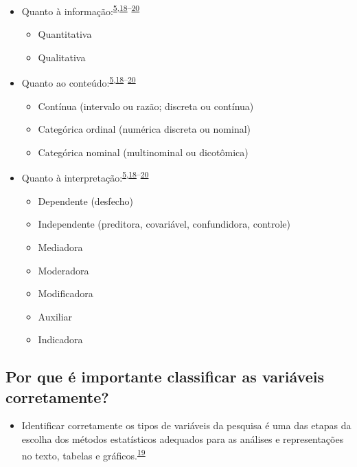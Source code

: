 \documentclass[
]{book}
\providecommand{\tightlist}{%
  \setlength{\itemsep}{0pt}\setlength{\parskip}{0pt}}
\begin{document}
\begin{itemize}
\item
  Quanto à informação:\textsuperscript{\protect\hyperlink{ref-vetter2017}{5},\protect\hyperlink{ref-Ali2016}{18}--\protect\hyperlink{ref-kaliyadan2019}{20}}

  \begin{itemize}
  \item
    Quantitativa
  \item
    Qualitativa
  \end{itemize}
\item
  Quanto ao conteúdo:\textsuperscript{\protect\hyperlink{ref-vetter2017}{5},\protect\hyperlink{ref-Ali2016}{18}--\protect\hyperlink{ref-kaliyadan2019}{20}}

  \begin{itemize}
  \item
    Contínua (intervalo ou razão; discreta ou contínua)
  \item
    Categórica ordinal (numérica discreta ou nominal)
  \item
    Categórica nominal (multinominal ou dicotômica)
  \end{itemize}
\item
  Quanto à interpretação:\textsuperscript{\protect\hyperlink{ref-vetter2017}{5},\protect\hyperlink{ref-Ali2016}{18}--\protect\hyperlink{ref-kaliyadan2019}{20}}

  \begin{itemize}
  \item
    Dependente (desfecho)
  \item
    Independente (preditora, covariável, confundidora, controle)
  \item
    Mediadora
  \item
    Moderadora
  \item
    Modificadora
  \item
    Auxiliar
  \item
    Indicadora
  \end{itemize}
\end{itemize}

\hypertarget{por-que-uxe9-importante-classificar-as-variuxe1veis-corretamente}{%
\subsection{Por que é importante classificar as variáveis corretamente?}\label{por-que-uxe9-importante-classificar-as-variuxe1veis-corretamente}}

\begin{itemize}
\tightlist
\item
  Identificar corretamente os tipos de variáveis da pesquisa é uma das etapas da escolha dos métodos estatísticos adequados para as análises e representações no texto, tabelas e gráficos.\textsuperscript{\protect\hyperlink{ref-Dettori2018}{19}}
\end{itemize}
\end{document}
